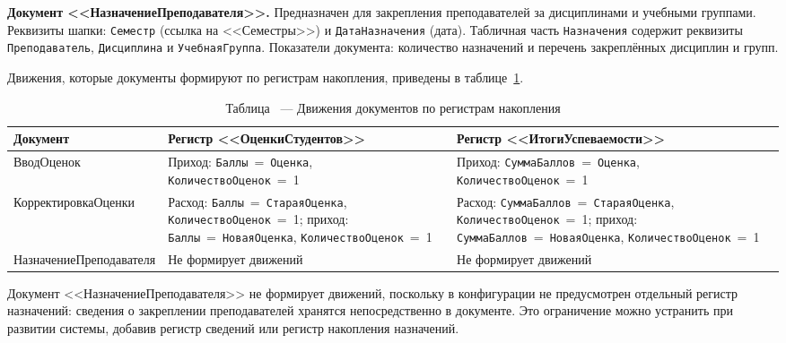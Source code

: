 \documentclass[14pt,a4paper]{extarticle}
\begin{document}
\noindent\textbf{Документ <<НазначениеПреподавателя>>.}
Предназначен для закрепления преподавателей за дисциплинами и учебными
группами. Реквизиты шапки: \texttt{Семестр} (ссылка на <<Семестры>>) и
\texttt{ДатаНазначения} (дата). Табличная часть \texttt{Назначения} содержит
реквизиты \texttt{Преподаватель}, \texttt{Дисциплина} и \texttt{УчебнаяГруппа}.
Показатели документа: количество назначений и перечень закреплённых дисциплин
и групп.

Движения, которые документы формируют по регистрам накопления, приведены в
таблице~\ref{tab:movements}.

\begin{table}[H]
    \centering
    \caption{Таблица \thetable\ --- Движения документов по регистрам накопления}
    \label{tab:movements}
    \footnotesize
    \begin{tabularx}{\textwidth}{@{}l >{\raggedright\arraybackslash}X >{\raggedright\arraybackslash}X@{}}
        \toprule
        Документ & Регистр <<ОценкиСтудентов>> & Регистр <<ИтогиУспеваемости>> \\
        \midrule
        ВводОценок &
        Приход: \texttt{Баллы}~=~\texttt{Оценка},
        \texttt{КоличествоОценок}~=~1 &
        Приход: \texttt{СуммаБаллов}~=~\texttt{Оценка},
        \texttt{КоличествоОценок}~=~1 \\
        КорректировкаОценки &
        Расход: \texttt{Баллы}~=~\texttt{СтараяОценка},
        \texttt{КоличествоОценок}~=~1;\newline
        приход: \texttt{Баллы}~=~\texttt{НоваяОценка},
        \texttt{КоличествоОценок}~=~1 &
        Расход: \texttt{СуммаБаллов}~=~\texttt{СтараяОценка},
        \texttt{КоличествоОценок}~=~1;\newline
        приход: \texttt{СуммаБаллов}~=~\texttt{НоваяОценка},
        \texttt{КоличествоОценок}~=~1 \\
        НазначениеПреподавателя &
        Не формирует движений &
        Не формирует движений \\
        \bottomrule
    \end{tabularx}
    \addtocounter{table}{-1}
\end{table}

Документ <<НазначениеПреподавателя>> не формирует движений, поскольку в
конфигурации не предусмотрен отдельный регистр назначений: сведения о
закреплении преподавателей хранятся непосредственно в документе. Это
ограничение можно устранить при развитии системы, добавив регистр сведений
или регистр накопления назначений.
\end{document}
